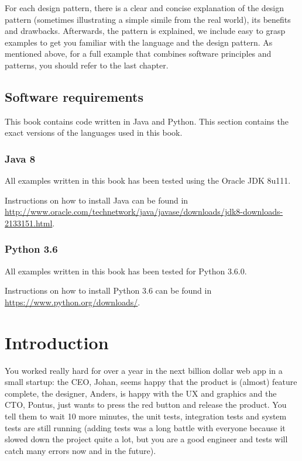 \documentclass[]{article}
\begin{document}
For each design pattern, there is a clear and concise explanation of the
design pattern (sometimes illustrating a simple simile from the real
world), its benefits and drawbacks. Afterwards, the pattern is
explained, we include easy to grasp examples to get you familiar with
the language and the design pattern. As mentioned above, for a full
example that combines software principles and patterns, you should refer
to the last chapter.

\subsection{Software requirements}\label{software-requirements}

This book contains code written in Java and Python. This section
contains the exact versions of the languages used in this book.

\subsubsection{Java 8}\label{java-8}

All examples written in this book has been tested using the Oracle JDK
8u111.

Instructions on how to install Java can be found in
\url{http://www.oracle.com/technetwork/java/javase/downloads/jdk8-downloads-2133151.html}.

\subsubsection{Python 3.6}\label{python-3.6}

All examples written in this book has been tested for Python 3.6.0.

Instructions on how to install Python 3.6 can be found in
\url{https://www.python.org/downloads/}.

\section{Introduction}\label{introduction}

You worked really hard for over a year in the next billion dollar web
app in a small startup: the CEO, Johan, seems happy that the product is
(almost) feature complete, the designer, Anders, is happy with the UX
and graphics and the CTO, Pontus, just wants to press the red button and
release the product. You tell them to wait 10 more minutes, the unit
tests, integration tests and system tests are still running (adding
tests was a long battle with everyone because it slowed down the project
quite a lot, but you are a good engineer and tests will catch many
errors now and in the future).
\end{document}
